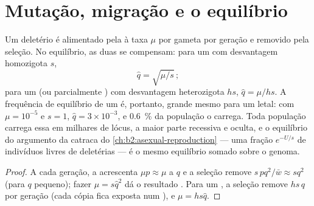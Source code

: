 \section{Mutação, migração e o equilíbrio}

\begin{theorem}\label{thm:b2:population-genetics:balance}
Um  deletério é alimentado pela  à taxa $\mu$ por gameta por
geração e removido pela seleção. No equilíbrio, as duas se compensam:
para um   com desvantagem homozigota $s$,
\[
\hat q = \sqrt{\mu/s}\,;
\]
para um   (ou parcialmente ) com desvantagem
heterozigota $hs$, $\hat q = \mu/hs$. A frequência de equilíbrio de um
 é, portanto, grande mesmo para um letal: com $\mu = 10^{-5}$ e
$s = 1$, $\hat q = 3\times 10^{-3}$, e \qty{0.6}{\%} da população
o carrega. Toda população carrega essa \emph{} em milhares
de lócus, a maior parte recessiva e oculta, e o equilíbrio do argumento
da catraca do \cref{ch:b2:asexual-reproduction}
--- uma fração $e^{-U/s}$ de indivíduos livres de 
deletérias --- é o mesmo equilíbrio somado sobre o genoma.
\end{theorem}
\begin{proof}
A cada geração, a  acrescenta $\mu p \approx \mu$ a $q$ e a
seleção remove $s\,pq^{2}/\bar w \approx sq^{2}$ (para $q$ pequeno);
fazer $\mu = s\hat q^{2}$ dá o resultado . Para um 
, a seleção remove $hs\,q$ por geração (cada cópia fica exposta
num ), e $\mu = hs\hat q$.
\end{proof}

